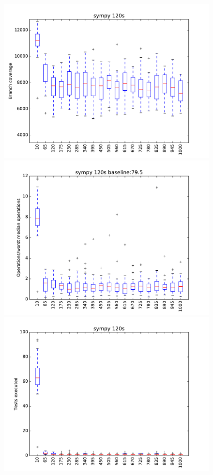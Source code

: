 \begin{figure}
\includegraphics[width=\columnwidth]{graphs/sympyrand120}
\includegraphics[width=\columnwidth]{graphs/opssympyrand120}
\includegraphics[width=\columnwidth]{graphs/execsympyrand120}
\end{figure}
